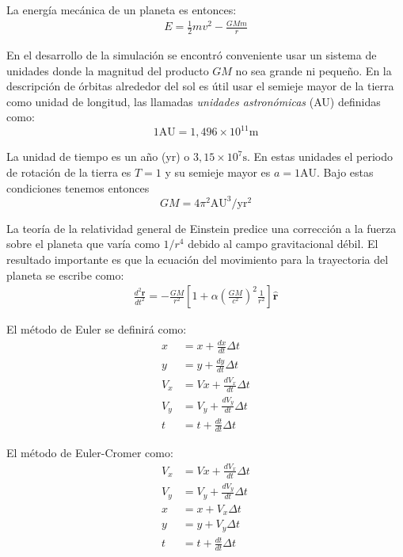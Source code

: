 \documentclass[twoside]{article}
\begin{document}
\begin{multicols}{2}
	La energía mecánica de un planeta es entonces:
	\begin{align}
		E = \frac{1}{2}mv^{2} - \frac{GMm}{r}
	\end{align}
	
	En el desarrollo de la simulación se encontró conveniente usar un sistema de unidades donde la magnitud del producto $ GM $ no sea grande ni pequeño. En la descripción de órbitas alrededor del sol es útil usar el semieje mayor de la tierra como unidad de longitud, las llamadas \textit{unidades astronómicas} (AU) definidas como:
	$$ 1 \mathrm{AU}=1,496 \times 10^{11} \mathrm{m} $$
	
	La unidad de tiempo es un año (yr) o $ 3,15 \times 10^{7} \mathrm{s} $. En estas unidades el periodo de rotación de la tierra es $ T = 1 $ y su semieje mayor es $ a = 1 \mathrm{AU} $. Bajo estas condiciones tenemos entonces
	$$ G M=4 \pi^{2} \mathrm{AU}^{3} / \mathrm{yr}^{2} $$
	
	La teoría de la relatividad general de Einstein predice una corrección a la fuerza sobre el planeta que varía como $ 1 / r^{4} $ debido al campo gravitacional débil. El resultado importante es que la ecuación del movimiento para la trayectoria del planeta se escribe como: 
	\begin{align}
		\frac{d^{2} \mathbf{r}}{d t^{2}}=-\frac{G M}{r^{2}}\left[1+\alpha\left(\frac{G M}{c^{2}}\right)^{2} \frac{1}{r^{2}}\right] \hat{\mathbf{r}}
	\end{align}
	
	El método de Euler se definirá como: 
	\begin{align*} 
	x & = x + \frac{dx}{dt} \Delta t \\
	y & = y + \frac{dy}{dt} \Delta t \\ 
	V_{x} & = Vx + \frac{dV_{x}} {dt} \Delta t \\
	V_{y} & = V_{y} + \frac{d V_{y}}{dt} \Delta t \\
	t & = t + \frac {dt } {dt } \Delta t 
	\end{align*}
	
	El método de Euler-Cromer como: 
	\begin{align*}
		V_{x} & = Vx + \frac{dV_{x}} {dt} \Delta t \\
		V_{y} & = V_{y} + \frac{d V_{y}}{dt} \Delta t \\
		x & = x + V_{x} \Delta t \\
		y & = y + V_{y} \Delta t \\ 
		t & = t + \frac {dt } {dt } \Delta t 
	\end{align*}
	

\end{multicols}
\end{document}
